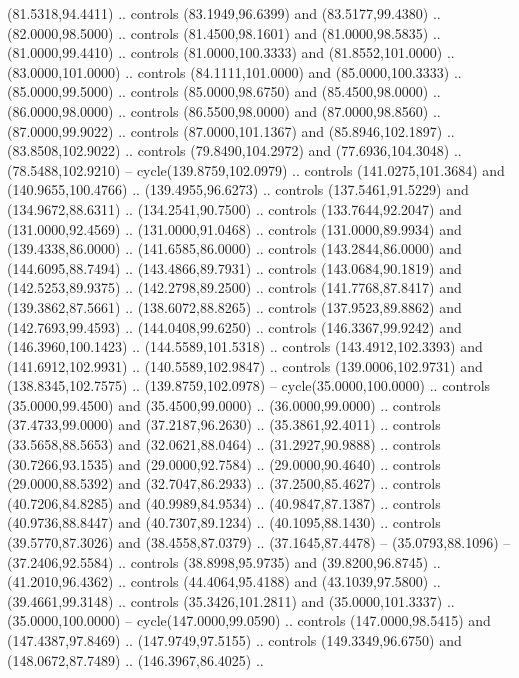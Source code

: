   (81.5318,94.4411) .. controls (83.1949,96.6399) and (83.5177,99.4380) ..
  (82.0000,98.5000) .. controls (81.4500,98.1601) and (81.0000,98.5835) ..
  (81.0000,99.4410) .. controls (81.0000,100.3333) and (81.8552,101.0000) ..
  (83.0000,101.0000) .. controls (84.1111,101.0000) and (85.0000,100.3333) ..
  (85.0000,99.5000) .. controls (85.0000,98.6750) and (85.4500,98.0000) ..
  (86.0000,98.0000) .. controls (86.5500,98.0000) and (87.0000,98.8560) ..
  (87.0000,99.9022) .. controls (87.0000,101.1367) and (85.8946,102.1897) ..
  (83.8508,102.9022) .. controls (79.8490,104.2972) and (77.6936,104.3048) ..
  (78.5488,102.9210) -- cycle(139.8759,102.0979) .. controls (141.0275,101.3684)
  and (140.9655,100.4766) .. (139.4955,96.6273) .. controls (137.5461,91.5229)
  and (134.9672,88.6311) .. (134.2541,90.7500) .. controls (133.7644,92.2047)
  and (131.0000,92.4569) .. (131.0000,91.0468) .. controls (131.0000,89.9934)
  and (139.4338,86.0000) .. (141.6585,86.0000) .. controls (143.2844,86.0000)
  and (144.6095,88.7494) .. (143.4866,89.7931) .. controls (143.0684,90.1819)
  and (142.5253,89.9375) .. (142.2798,89.2500) .. controls (141.7768,87.8417)
  and (139.3862,87.5661) .. (138.6072,88.8265) .. controls (137.9523,89.8862)
  and (142.7693,99.4593) .. (144.0408,99.6250) .. controls (146.3367,99.9242)
  and (146.3960,100.1423) .. (144.5589,101.5318) .. controls (143.4912,102.3393)
  and (141.6912,102.9931) .. (140.5589,102.9847) .. controls (139.0006,102.9731)
  and (138.8345,102.7575) .. (139.8759,102.0978) -- cycle(35.0000,100.0000) ..
  controls (35.0000,99.4500) and (35.4500,99.0000) .. (36.0000,99.0000) ..
  controls (37.4733,99.0000) and (37.2187,96.2630) .. (35.3861,92.4011) ..
  controls (33.5658,88.5653) and (32.0621,88.0464) .. (31.2927,90.9888) ..
  controls (30.7266,93.1535) and (29.0000,92.7584) .. (29.0000,90.4640) ..
  controls (29.0000,88.5392) and (32.7047,86.2933) .. (37.2500,85.4627) ..
  controls (40.7206,84.8285) and (40.9989,84.9534) .. (40.9847,87.1387) ..
  controls (40.9736,88.8447) and (40.7307,89.1234) .. (40.1095,88.1430) ..
  controls (39.5770,87.3026) and (38.4558,87.0379) .. (37.1645,87.4478) --
  (35.0793,88.1096) -- (37.2406,92.5584) .. controls (38.8998,95.9735) and
  (39.8200,96.8745) .. (41.2010,96.4362) .. controls (44.4064,95.4188) and
  (43.1039,97.5800) .. (39.4661,99.3148) .. controls (35.3426,101.2811) and
  (35.0000,101.3337) .. (35.0000,100.0000) -- cycle(147.0000,99.0590) ..
  controls (147.0000,98.5415) and (147.4387,97.8469) .. (147.9749,97.5155) ..
  controls (149.3349,96.6750) and (148.0672,87.7489) .. (146.3967,86.4025) ..
